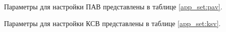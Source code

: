 
\stopTable


\par
Параметры для настройки ПАВ представлены в таблице \ref{app_set:pav}.


\stopTable


\par
Параметры для настройки КСВ представлены в таблице \ref{app_set:ksv}.



